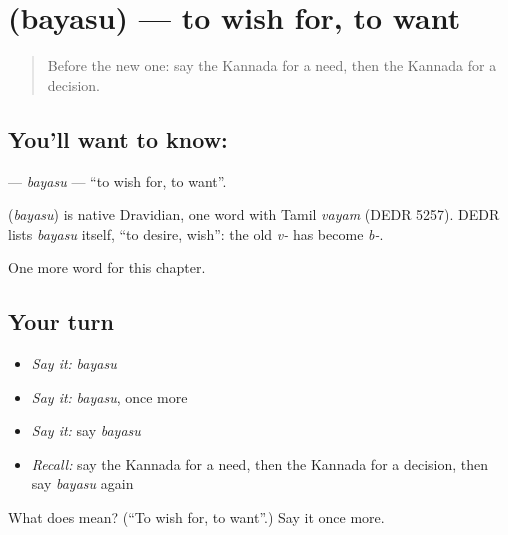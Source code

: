 \section[\texorpdfstring{\kn{ಬಯಸು} (bayasu)}{ಬಯಸು (bayasu)}]{ (bayasu) — to wish for, to want}

\label{lesson:KA-C114-bayasu}



\begin{quote}
Before the new one: say the Kannada for a need, then the Kannada for a decision.
\end{quote}

\subsection*{You'll want to know: }
\textbf{} — \emph{bayasu} — \textquotedblleft{}to wish for, to want\textquotedblright{}.

\begin{cousinweb}
\textbf{} (\emph{bayasu}) is native Dravidian, one word with Tamil \emph{vayam} (DEDR 5257). DEDR lists \emph{bayasu} itself, \textquotedblleft{}to desire, wish\textquotedblright{}: the old \emph{v-} has become \emph{b-}.
\end{cousinweb}

\begin{grammarlens}[title={What you've built}]
One more word for this chapter.
\end{grammarlens}

\subsection*{Your turn}
\begin{itemize}
\raggedright
  \item \emph{Say it:} \emph{bayasu}
  \item \emph{Say it:} \emph{bayasu}, once more
  \item \emph{Say it:} say \emph{bayasu}
  \item \emph{Recall:} say the Kannada for a need, then the Kannada for a decision, then say \emph{bayasu} again
\end{itemize}

\begin{tcolorbox}[breakable,colback=teal!4,colframe=teal!35!black,title={Before you move on}]
What does  mean? (\textquotedblleft{}To wish for, to want\textquotedblright{}.) Say it once more.
\end{tcolorbox}
